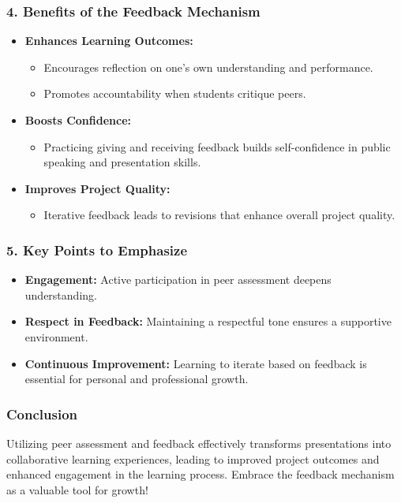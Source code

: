 \documentclass[aspectratio=169]{beamer}
\begin{document}
\begin{frame}[fragile]
    \frametitle{4. Benefits of the Feedback Mechanism}
    \begin{itemize}
        \item \textbf{Enhances Learning Outcomes:}
        \begin{itemize}
            \item Encourages reflection on one’s own understanding and performance.
            \item Promotes accountability when students critique peers.
        \end{itemize}
        \item \textbf{Boosts Confidence:}
        \begin{itemize}
            \item Practicing giving and receiving feedback builds self-confidence in public speaking and presentation skills.
        \end{itemize}
        \item \textbf{Improves Project Quality:}
        \begin{itemize}
            \item Iterative feedback leads to revisions that enhance overall project quality.
        \end{itemize}
    \end{itemize}
\end{frame}

\begin{frame}[fragile]
    \frametitle{5. Key Points to Emphasize}
    \begin{itemize}
        \item \textbf{Engagement:} Active participation in peer assessment deepens understanding.
        \item \textbf{Respect in Feedback:} Maintaining a respectful tone ensures a supportive environment.
        \item \textbf{Continuous Improvement:} Learning to iterate based on feedback is essential for personal and professional growth.
    \end{itemize}
\end{frame}

\begin{frame}[fragile]
    \frametitle{Conclusion}
    Utilizing peer assessment and feedback effectively transforms presentations into collaborative learning experiences, leading to improved project outcomes and enhanced engagement in the learning process. Embrace the feedback mechanism as a valuable tool for growth!
\end{frame}
\end{document}
